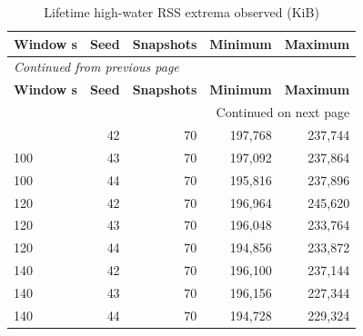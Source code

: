 \documentclass[10pt,a4paper]{article}
\begin{document}
\begingroup\small\setlength{\tabcolsep}{4pt}\renewcommand{\arraystretch}{1.12}
\begin{longtable}{@{}lrrrr@{}}
\caption{Lifetime high-water RSS extrema observed (KiB)}\\
\toprule
\textbf{Window s} & \textbf{Seed} & \textbf{Snapshots} & \textbf{Minimum} & \textbf{Maximum} \\
\midrule\endfirsthead
\multicolumn{5}{l}{\small\itshape Continued from previous page}\\
\toprule
\textbf{Window s} & \textbf{Seed} & \textbf{Snapshots} & \textbf{Minimum} & \textbf{Maximum} \\
\midrule\endhead
\midrule\multicolumn{5}{r}{\small Continued on next page}\\\endfoot
\bottomrule\endlastfoot
100 & 42 & 70 & 197,768 & 237,744 \\
100 & 43 & 70 & 197,092 & 237,864 \\
100 & 44 & 70 & 195,816 & 237,896 \\
120 & 42 & 70 & 196,964 & 245,620 \\
120 & 43 & 70 & 196,048 & 233,764 \\
120 & 44 & 70 & 194,856 & 233,872 \\
140 & 42 & 70 & 196,100 & 237,144 \\
140 & 43 & 70 & 196,156 & 227,344 \\
140 & 44 & 70 & 194,728 & 229,324 \\
\end{longtable}\endgroup
\end{document}
